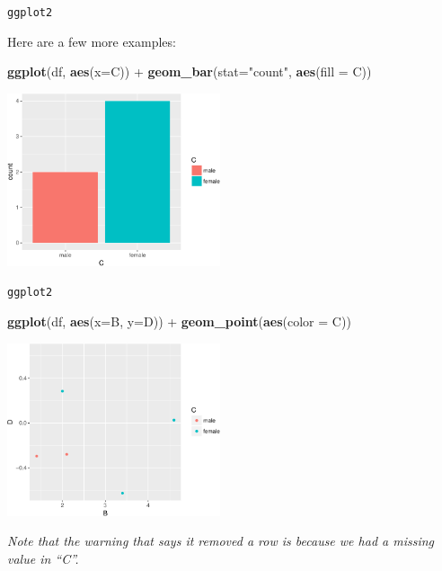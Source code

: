\documentclass[10pt,ignorenonframetext,]{beamer}
\newenvironment{Shaded}{\begin{snugshade}}{\end{snugshade}}
\newcommand{\KeywordTok}[1]{\textcolor[rgb]{0.13,0.29,0.53}{\textbf{{#1}}}}
\newcommand{\DataTypeTok}[1]{\textcolor[rgb]{0.13,0.29,0.53}{{#1}}}
\newcommand{\StringTok}[1]{\textcolor[rgb]{0.31,0.60,0.02}{{#1}}}
\newcommand{\NormalTok}[1]{{#1}}
\begin{document}
\begin{frame}[fragile]{\texttt{ggplot2}}

Here are a few more examples:

\begin{Shaded}
\begin{Highlighting}[]
\KeywordTok{ggplot}\NormalTok{(df, }\KeywordTok{aes}\NormalTok{(}\DataTypeTok{x=}\NormalTok{C)) +}
\StringTok{  }\KeywordTok{geom_bar}\NormalTok{(}\DataTypeTok{stat=}\StringTok{"count"}\NormalTok{, }\KeywordTok{aes}\NormalTok{(}\DataTypeTok{fill =} \NormalTok{C))}
\end{Highlighting}
\end{Shaded}

\centerline{\includegraphics[height=2in]{03_UnderstandData_files/figure-beamer/unnamed-chunk-12-1.pdf}}

\end{frame}

\begin{frame}[fragile]{\texttt{ggplot2}}

\begin{Shaded}
\begin{Highlighting}[]
\KeywordTok{ggplot}\NormalTok{(df, }\KeywordTok{aes}\NormalTok{(}\DataTypeTok{x=}\NormalTok{B, }\DataTypeTok{y=}\NormalTok{D)) +}
\StringTok{  }\KeywordTok{geom_point}\NormalTok{(}\KeywordTok{aes}\NormalTok{(}\DataTypeTok{color =} \NormalTok{C))}
\end{Highlighting}
\end{Shaded}

\centerline{\includegraphics[height=2in]{03_UnderstandData_files/figure-beamer/unnamed-chunk-13-1.pdf}}
\emph{Note that the warning that says it removed a row is because we had
a missing value in ``C''.}

\end{frame}
\end{document}
